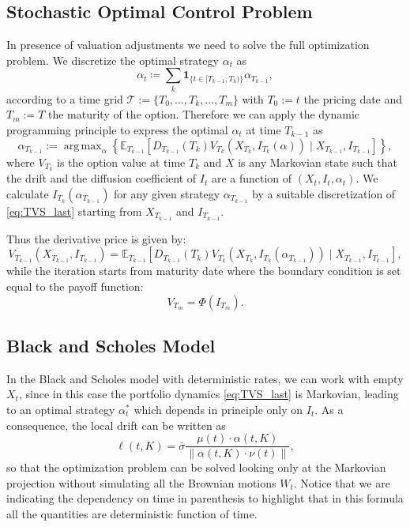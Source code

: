 \documentclass[11pt]{article}
\DeclareMathOperator*{\argmax}{arg\,max}
\begin{document}
\subsection{Stochastic Optimal Control Problem}
In presence of valuation adjustments we need to solve the full optimization problem. We discretize the optimal strategy $\alpha_t$ as
\begin{equation}
    \alpha_t \coloneqq \sum_k \mathbf{1}_{ \{t \in [T_{k-1}, T_k)\}}\alpha_{T_{k-1}},
\label{eq:piecewise_strategy}\end{equation}
according to a time grid $\mathcal{T}:=\{T_0,...,T_k,...,T_m\}$ with $T_0:=t$ the pricing date and $T_m :=T$ the maturity of the option. 
Therefore we can apply the dynamic programming principle to express the optimal $\alpha_t$ at time $T_{k-1}$ as
\begin{equation}
    \alpha_{T_{k-1}}:=\argmax_{\alpha} \left\{\mathbb{E}_{T_{k-1}}\left[D_{T_{k-1}}\left(T_{k} \right) V_{T_{k}}\left(X_{T_{k}}, I_{T_{k}}(\alpha)\right) \mid X_{T_{k-1}}, I_{T_{k-1}}\right]\right\},
\label{eq:recursion}\end{equation}
where $V_{T_k}$ is the option value at time $T_k$ and $X$ is any Markovian state such that the drift and the diffusion coefficient of $I_t$ are a function of $\left(X_t,I_t,\alpha_t\right)$. We calculate $I_{T_k}\left(\alpha_{T_{k-1}}\right)$ for any given strategy $\alpha_{T_{k-1}}$ by a suitable discretization of \eqref{eq:TVS_last} starting from $X_{T_{k-1}}$ and $I_{T_{k-1}}$.

Thus the derivative price is given by:
\begin{equation}
    V_{T_{k-1}}\left(X_{T_{k-1}}, I_{T_{k-1}}\right)=\mathbb{E}_{T_{k-1}}\left[D_{T_{k-1}}\left(T_{k}\right) V_{T_{k}}\left(X_{T_{k}}, I_{T_{k}}\left(\alpha_{T_{k-1}}\right)\right) \mid X_{T_{k-1}}, I_{T_{k-1}}\right],
\label{eq:recursion2}\end{equation}
while the iteration starts from maturity date where the boundary condition is set equal to the payoff function:
\begin{equation}
    V_{T_m} = \Phi\left(I_{T_m}\right).
\end{equation}

\subsection{Black and Scholes Model}
In the Black and Scholes model with deterministic rates, we can work with empty $X_t$, since in this case the portfolio dynamics \eqref{eq:TVS_last} is Markovian, leading to an optimal strategy $\alpha_t^*$ which depends in principle only on $I_t$. As a consequence, the local drift can be written as
\begin{equation}
     \ell \left(t,K\right) = \bar{\sigma}   \frac{\mu\left(t\right) \cdot \alpha\left(t,K\right)}{\|\alpha\left(t,K\right) \cdot \nu\left(t\right)\|},  
\end{equation}
so that the optimization problem can be solved looking only at the Markovian projection without simulating all the Brownian motions $W_t$. Notice that we are indicating the dependency on time in parenthesis to highlight that in this formula all the quantities are deterministic function of time.
\end{document}
